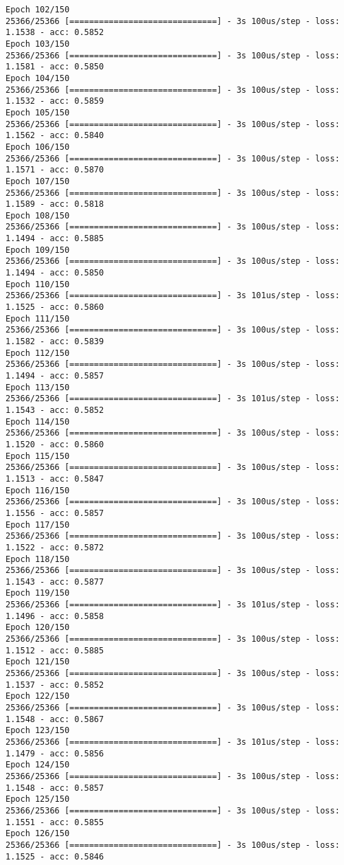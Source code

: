 \documentclass[11pt]{article}
\begin{document}
\begin{Verbatim}[commandchars=\\\{\}]
Epoch 102/150
25366/25366 [==============================] - 3s 100us/step - loss: 1.1538 - acc: 0.5852
Epoch 103/150
25366/25366 [==============================] - 3s 100us/step - loss: 1.1581 - acc: 0.5850
Epoch 104/150
25366/25366 [==============================] - 3s 100us/step - loss: 1.1532 - acc: 0.5859
Epoch 105/150
25366/25366 [==============================] - 3s 100us/step - loss: 1.1562 - acc: 0.5840
Epoch 106/150
25366/25366 [==============================] - 3s 100us/step - loss: 1.1571 - acc: 0.5870
Epoch 107/150
25366/25366 [==============================] - 3s 100us/step - loss: 1.1589 - acc: 0.5818
Epoch 108/150
25366/25366 [==============================] - 3s 100us/step - loss: 1.1494 - acc: 0.5885
Epoch 109/150
25366/25366 [==============================] - 3s 100us/step - loss: 1.1494 - acc: 0.5850
Epoch 110/150
25366/25366 [==============================] - 3s 101us/step - loss: 1.1525 - acc: 0.5860
Epoch 111/150
25366/25366 [==============================] - 3s 100us/step - loss: 1.1582 - acc: 0.5839
Epoch 112/150
25366/25366 [==============================] - 3s 100us/step - loss: 1.1494 - acc: 0.5857
Epoch 113/150
25366/25366 [==============================] - 3s 101us/step - loss: 1.1543 - acc: 0.5852
Epoch 114/150
25366/25366 [==============================] - 3s 100us/step - loss: 1.1520 - acc: 0.5860
Epoch 115/150
25366/25366 [==============================] - 3s 100us/step - loss: 1.1513 - acc: 0.5847
Epoch 116/150
25366/25366 [==============================] - 3s 100us/step - loss: 1.1556 - acc: 0.5857
Epoch 117/150
25366/25366 [==============================] - 3s 100us/step - loss: 1.1522 - acc: 0.5872
Epoch 118/150
25366/25366 [==============================] - 3s 100us/step - loss: 1.1543 - acc: 0.5877
Epoch 119/150
25366/25366 [==============================] - 3s 101us/step - loss: 1.1496 - acc: 0.5858
Epoch 120/150
25366/25366 [==============================] - 3s 100us/step - loss: 1.1512 - acc: 0.5885
Epoch 121/150
25366/25366 [==============================] - 3s 100us/step - loss: 1.1537 - acc: 0.5852
Epoch 122/150
25366/25366 [==============================] - 3s 100us/step - loss: 1.1548 - acc: 0.5867
Epoch 123/150
25366/25366 [==============================] - 3s 101us/step - loss: 1.1479 - acc: 0.5856
Epoch 124/150
25366/25366 [==============================] - 3s 100us/step - loss: 1.1548 - acc: 0.5857
Epoch 125/150
25366/25366 [==============================] - 3s 100us/step - loss: 1.1551 - acc: 0.5855
Epoch 126/150
25366/25366 [==============================] - 3s 100us/step - loss: 1.1525 - acc: 0.5846

\end{Verbatim}
\end{document}
